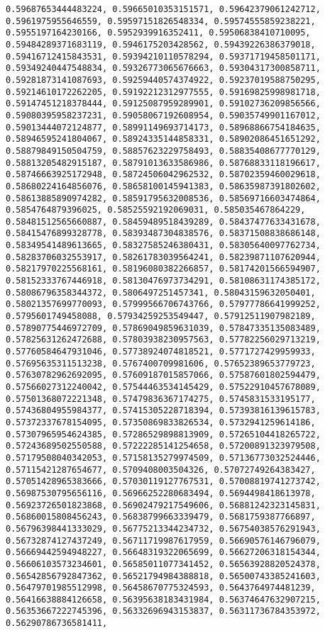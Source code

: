\documentclass[11pt]{article}
\begin{document}
\begin{Verbatim}[commandchars=\\\{\}]
0.59687653444483224, 0.59665010353151571, 0.59642379061242712, 0.5961975955646559, 0.59597151826548334, 0.59574555859238221, 0.5955197164230166, 0.5952939916352411, 0.59506838410710095, 0.59484289371683119, 0.5946175203428562, 0.59439226386379018, 0.59416712415843531, 0.59394210110578294, 0.59371719458501171, 0.59349240447548834, 0.59326773065676663, 0.59304317300858711, 0.59281873141087693, 0.59259440574374922, 0.59237019588750295, 0.59214610172262205, 0.59192212312977555, 0.59169825998981718, 0.59147451218378444, 0.59125087959289901, 0.59102736209856566, 0.59080395958237231, 0.59058067192608954, 0.59035749901167012, 0.59013444072124877, 0.58991149693714173, 0.58968866754184635, 0.58946595241804067, 0.58924335144858331, 0.58902086451651292, 0.58879849150504759, 0.58857623229758493, 0.58835408677770129, 0.58813205482915187, 0.58791013633586986, 0.58768833118196617, 0.58746663925172948, 0.58724506042962532, 0.58702359460029618, 0.58680224164856076, 0.58658100145941383, 0.58635987391802602, 0.58613885890974282, 0.58591795632008536, 0.58569716603474864, 0.5854764879396025, 0.58525592192069031, 0.585035467864229, 0.58481512565660887, 0.58459489518439289, 0.58437477633431678, 0.58415476899328778, 0.58393487304838576, 0.58371508838686148, 0.58349541489613665, 0.58327585246380431, 0.58305640097762734, 0.58283706032553917, 0.58261783039564241, 0.58239871107620944, 0.58217970225568161, 0.58196080382266857, 0.58174201566594907, 0.58152333767446918, 0.58130476973734291, 0.58108631174385172, 0.58086796358344372, 0.5806497251457341, 0.58043159632050401, 0.58021357699770093, 0.57999566706743766, 0.57977786641999252, 0.5795601749458088, 0.57934259253549447, 0.57912511907982189, 0.57890775446972709, 0.57869049859631039, 0.57847335135083489, 0.57825631262472688, 0.57803938230957563, 0.57782256029713219, 0.57760584647931046, 0.57738924074818521, 0.5771727429959933, 0.57695635311513238, 0.5767400709981606, 0.57652389653779723, 0.57630782962692095, 0.57609187015857066, 0.57587601802594479, 0.57566027312240042, 0.57544463534145429, 0.57522910457678089, 0.57501368072221348, 0.57479836367174275, 0.5745831533195177, 0.57436804955984377, 0.57415305228718394, 0.57393816139615783, 0.57372337678154095, 0.57350869833826534, 0.5732941259614186, 0.57307965954624385, 0.57286529898813909, 0.57265104418265722, 0.57243689502550588, 0.57222285141254658, 0.57200891323979508, 0.57179508040342053, 0.57158135279974509, 0.57136773032524446, 0.57115421287654677, 0.5709408003504326, 0.57072749264383427, 0.57051428965383666, 0.57030119127767531, 0.57008819741273742, 0.56987530795656116, 0.56966252280683494, 0.5694498418613978, 0.56923726501823868, 0.56902479217549606, 0.56881242323145831, 0.56860015808456243, 0.56838799663339479, 0.5681759387766897, 0.56796398441333029, 0.56775213344234732, 0.56754038576291943, 0.56732874127437249, 0.56711719987617959, 0.56690576146796079, 0.56669442594948227, 0.56648319322065699, 0.56627206318154344, 0.56606103573234601, 0.56585011077341452, 0.56563928820524378, 0.56542856792847362, 0.56521794984388818, 0.56500743385241603, 0.56479701985512998, 0.56458670775324593, 0.5643764974481239, 0.56416638884126658, 0.56395638183431984, 0.56374647632907215, 0.56353667222745396, 0.56332696943153837, 0.56311736784353972, 0.56290786736581411, 
\end{Verbatim}
\end{document}
